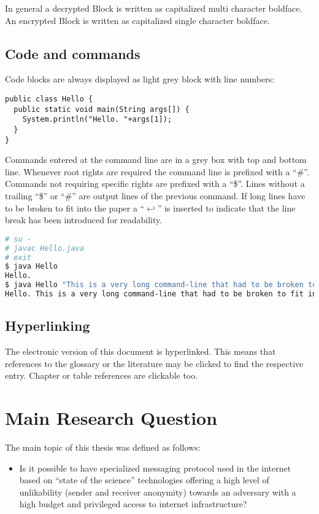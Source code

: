 In general a decrypted Block is written as capitalized multi character boldface. An encrypted Block is written as capitalized single character boldface.

\section{Code and commands}
Code blocks are always displayed as light grey block with line numbers:

\begin{lstlisting}
public class Hello {
  public static void main(String args[]) {
    System.println("Hello. "+args[1]);
  }
}
\end{lstlisting}

Commands entered at the command line are in a grey box with top and bottom line. Whenever root rights are required the command line is prefixed with a ``\#''. Commands not requiring specific rights are prefixed with a ``\$''. Lines without a trailing ``\$'' or ``\#'' are output lines of the previous command. If long lines have to be broken to fit into the paper a ``$\hookleftarrow$'' is inserted to indicate that the line break has been introduced for readability.

\begin{lstlisting}[language=bash]
# su -
# javac Hello.java 
# exit
$ java Hello
Hello.
$ java Hello "This is a very long command-line that had to be broken to fit into the code box displayed on this page."
Hello. This is a very long command-line that had to be broken to fit into the code box displayed on this page.
\end{lstlisting}

\section{Hyperlinking}
The electronic version of this  document is hyperlinked. This means that references to the glossary or the literature may be clicked to find the respective entry. Chapter or table references are clickable too. 

\chapter{Main Research Question}
The main topic of this thesis was defined as follows:
\begin{itemize}
	\item Is it possible to have specialized messaging protocol used in the internet based on ``state of the science'' technologies offering a high level of unlikability (sender and receiver anonymity) towards an adversary with a high budget and privileged access to internet infrastructure?
\end{itemize}

